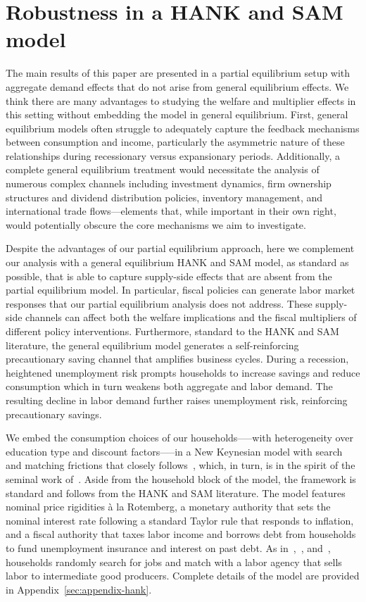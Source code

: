 \documentclass[\latexroot/\projectname]{subfiles}
\begin{document}
\FloatBarrier
\section{Robustness in a HANK and SAM model}
\whenintegrated{\label{sec:hank}} %

The main results of this paper are presented in a partial equilibrium setup with aggregate demand effects that do not arise from general equilibrium effects. We think there are many advantages to studying the welfare and multiplier effects in this setting without embedding the model in general equilibrium.  First, general equilibrium models often struggle to adequately capture the feedback mechanisms between consumption and income, particularly the asymmetric nature of these relationships during recessionary versus expansionary periods. Additionally, a complete general equilibrium treatment would necessitate the analysis of numerous complex channels including investment dynamics, firm ownership structures and dividend distribution policies, inventory management, and international trade flows—elements that, while important in their own right, would potentially obscure the core mechanisms we aim to investigate.

Despite the advantages of our partial equilibrium approach, here we complement our analysis with a general equilibrium HANK and SAM model, as standard as possible, that is able to capture supply-side effects that are absent from the partial equilibrium model. In particular, fiscal policies can generate labor market responses that our partial equilibrium analysis does not address. These supply-side channels can affect both the welfare implications and the fiscal multipliers of different policy interventions. Furthermore, standard to the HANK and SAM literature, the general equilibrium model generates a self-reinforcing precautionary saving channel that amplifies business cycles. During a recession, heightened unemployment risk prompts households to increase savings and reduce consumption which in turn weakens both aggregate and labor demand. The resulting decline in labor demand further raises unemployment risk, reinforcing precautionary savings.

We embed the consumption choices of our households—--with heterogeneity over education type and discount factors—--in a New Keynesian model with search and matching frictions that closely follows~\cite{Du2025}, which, in turn, is in the spirit of the seminal work of~\cite{Ravn2017,Ravn2021}. Aside from the household block of the model, the framework is standard and follows from the HANK and SAM literature. The model features nominal price rigidities \`{a} la Rotemberg, a monetary authority that sets the nominal interest rate following a standard Taylor rule that responds to inflation, and a fiscal authority that taxes labor income and borrows debt from households to fund unemployment insurance and interest on past debt. As in~\cite{Gornemann2021},~\cite{Bardoczy2021}, and~\cite{gravesUnemployment}, households randomly search for jobs and match with a labor agency that sells labor to intermediate good producers. Complete details of the model are provided in Appendix~\ref{sec:appendix-hank}.
\end{document}
